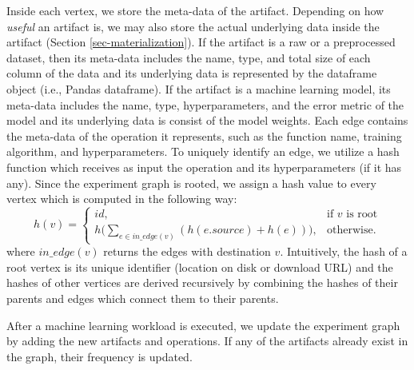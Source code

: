 Inside each vertex, we store the meta-data of the artifact.
Depending on how \textit{useful} an artifact is, we may also store the actual underlying data inside the artifact (Section \ref{sec-materialization}).
If the artifact is a raw or a preprocessed dataset, then its meta-data includes the name, type, and total size of each column of the data and its underlying data is represented by the dataframe object (i.e., Pandas dataframe). 
If the artifact is a machine learning model, its meta-data includes the name, type, hyperparameters, and the error metric of the model and its underlying data is consist of the model weights.
Each edge contains the meta-data of the operation it represents, such as the function name, training algorithm, and hyperparameters.
To uniquely identify an edge, we utilize a hash function which receives as input the operation and its hyperparameters (if it has any).
Since the experiment graph is rooted, we assign a hash value to every vertex which is computed in the following way:
\[
    h(v)= 
\begin{cases}
    id,& \text{if } v \text{ is root}\\
    h\Big(\sum\limits_{e \in in\_edge(v)} (h(e.source) + h(e) ) \Big)  ,              & \text{otherwise}.
\end{cases}
\]
where $in\_edge(v)$ returns the edges with destination $v$. 
Intuitively, the hash of a root vertex is its unique identifier (location on disk or download URL) and the hashes of other vertices are derived recursively by combining the hashes of their parents and edges which connect them to their parents.
%
%

After a machine learning workload is executed, we update the experiment graph by adding the new artifacts and operations.
If any of the artifacts already exist in the graph, their frequency is updated.

